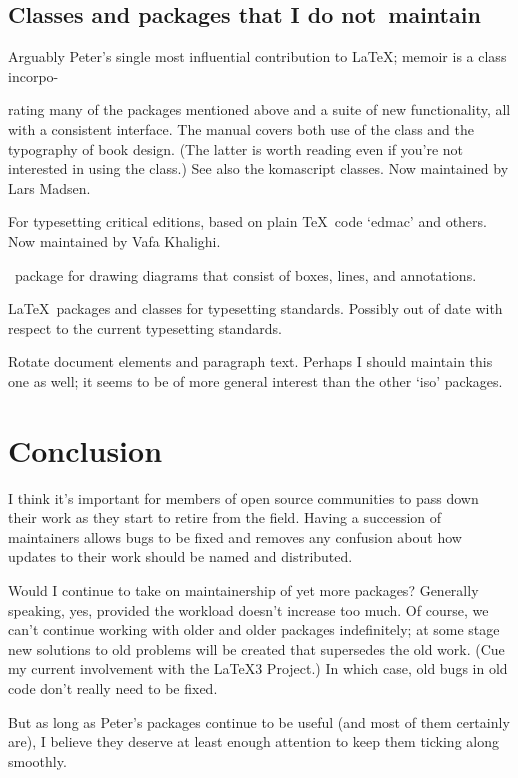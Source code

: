 \documentclass[final]{ltugboat}
\begin{document}
\subsection{Classes and packages that I do not~maintain}

\begin{description}[font=\normalfont\sffamily]
\item [memoir] Arguably Peter's single most influential contribution to \LaTeX; \textsf{memoir} is a class incorpo-
{\parfillskip=0pt\par\newpage\noindent}%
rating many of the packages mentioned above and a suite of new functionality, all with a consistent interface. The manual covers both use of the class and the typography of book design. (The latter is worth reading even if you're not interested in using the class.)
See also the \textsf{komascript} classes.
Now maintained by Lars Madsen.
\item [ledmac/ledpar/ledarab]  For typesetting critical editions, based on plain \TeX\ code `\textsf{edmac}' and others. Now maintained by Vafa Khalighi.
\item [expressg] \MP\ package for drawing diagrams that consist of boxes, lines, and annotations.
\item [iso \& iso10303] \LaTeX\ packages and classes for typesetting  standards. Possibly out of date with respect to the current typesetting standards.
\item [isorot] Rotate document elements and paragraph text. Perhaps I should maintain this one as well; it seems to be of more general interest than the other `\textsf{iso}' packages.
\end{description}

\medskip
\section{Conclusion}

I think it's important for members of open source communities to pass down their work as they start to retire from the field. Having a succession of maintainers allows bugs to be fixed and removes any confusion about how updates to their work should be named and distributed.

Would I continue to take on maintainership of yet more packages? Generally speaking, yes, provided the workload doesn't increase too much. Of course, we can't continue working with older and older packages indefinitely; at some stage new solutions to old problems will be created that supersedes the old work. (Cue my current involvement with the \LaTeX3 Project.) In which case, old bugs in old code don't really need to be fixed.

But as long as Peter's packages continue to be useful (and most of them certainly are), I believe they deserve at least enough attention to keep them ticking along smoothly.

\medskip
\makesignature
\end{document}
